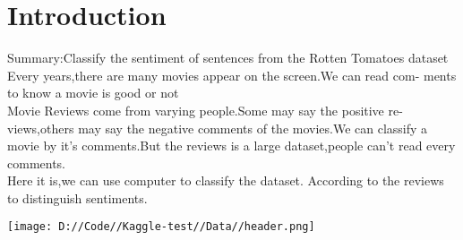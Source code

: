 \section{Introduction}\label{sec-intro}

     Summary:Classify the sentiment of sentences from the Rotten Tomatoes
    dataset\\
    Every years,there are many movies appear on the screen.We can read com-
    ments to know a movie is good or not\\
    Movie Reviews come from varying people.Some may say the positive re-
    views,others may say the negative comments of the movies.We can classify
    a movie by it’s comments.But the reviews is a large dataset,people can’t read
    every comments.\\
    Here it is,we can use computer to classify the dataset.
    According to the reviews to distinguish sentiments.


\texttt{[image: D://Code//Kaggle-test//Data//header.png]}





